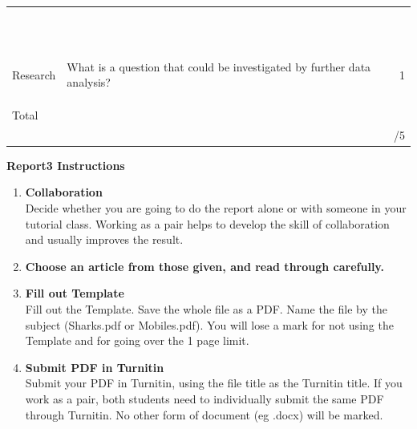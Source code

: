 \documentclass[bigtut]{quiz}\usepackage[]{graphicx}\usepackage[]{color}
\begin{document}
\begin{tutorial}
\begin{tabular}{|l|l|r|}
& & \\ 
& & \\ 
& & \\ 
& & \\ 
& & \\ 
& & \\ 
& & \\ 
& & \\ 
& & \\ 
& & \\ 
& & \\ 
& & \\\hline
Research & {\tiny What is a question that could be investigated by further data analysis?} & 1 \\
& & \\
& & \\
& & \\ \hline
Total & &  \\ 
& & /5 \\ \hline
\end{tabular}



\newpage
{\bf Report3 Instructions}
\begin{enumerate}
\item {\bf Collaboration} \\
Decide whether you are going to do the report alone or with someone in your tutorial class. Working as a pair helps to develop the skill of collaboration and usually improves the result. \\
\item {\bf Choose an article from those given, and read through carefully.} \\
 
\item {\bf Fill out Template} \\
Fill out the Template. Save the whole file as a PDF. Name the file by the subject (Sharks.pdf or Mobiles.pdf). You will lose a mark for not using the Template and for going over the 1 page limit. \\
\item {\bf Submit PDF in Turnitin} \\
Submit your PDF in Turnitin, using the file title as the Turnitin title. If you work as a pair, both students need to individually submit the same PDF through Turnitin. No other form of document (eg .docx) will be marked. \\


\end{enumerate}
\end{tutorial}
\end{document}
